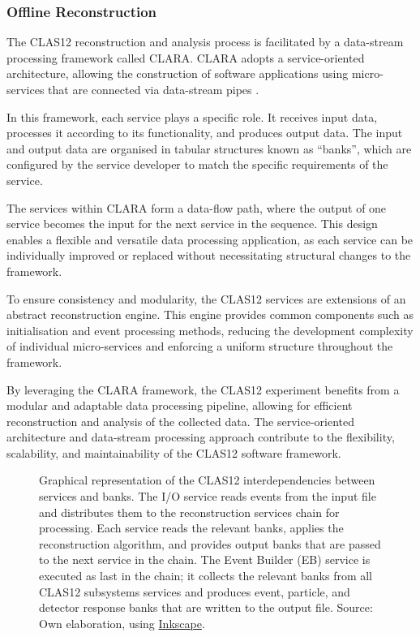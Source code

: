 \subsubsection{Offline Reconstruction}
\label{11.230::offline_reconstruction}
    The CLAS12 reconstruction and analysis process is facilitated by a data-stream processing framework called CLARA.
    CLARA adopts a service-oriented architecture, allowing the construction of software applications using micro-services that are connected via data-stream pipes \cite{gyurgyan2016}.

    In this framework, each service plays a specific role.
    It receives input data, processes it according to its functionality, and produces output data.
    The input and output data are organised in tabular structures known as ``banks'', which are configured by the service developer to match the specific requirements of the service.

    The services within CLARA form a data-flow path, where the output of one service becomes the input for the next service in the sequence.
    This design enables a flexible and versatile data processing application, as each service can be individually improved or replaced without necessitating structural changes to the framework.

    To ensure consistency and modularity, the CLAS12 services are extensions of an abstract reconstruction engine.
    This engine provides common components such as initialisation and event processing methods, reducing the development complexity of individual micro-services and enforcing a uniform structure throughout the framework.

    By leveraging the CLARA framework, the CLAS12 experiment benefits from a modular and adaptable data processing pipeline, allowing for efficient reconstruction and analysis of the collected data.
    The service-oriented architecture and data-stream processing approach contribute to the flexibility, scalability, and maintainability of the CLAS12 software framework.

    \begin{figure}[b!]
        \centering{}
        \caption[CLAS12 Reconstruction Chain.]{Graphical representation of the CLAS12 interdependencies between services and banks.
        The I/O service reads events from the input file and distributes them to the reconstruction services chain for processing.
        Each service reads the relevant banks, applies the reconstruction algorithm, and provides output banks that are passed to the next service in the chain.
        The Event Builder (EB) service is executed as last in the chain; it collects the relevant banks from all CLAS12 subsystems services and produces event, particle, and detector response banks that are written to the output file.
        Source: Own elaboration, using \href{https://inkscape.org/}{Inkscape}.}
        \label{fig::11.230::recon_chain}
    \end{figure}

